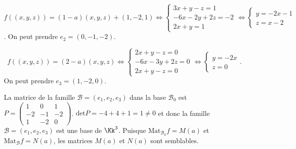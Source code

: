 {{\textbullet~$f((x,y,z)) =(1-a)(x,y,z)+(1,-2,1)\Leftrightarrow\left\{
\begin{array}{l}
3x+y-z=1\\
-6x-2y+2z=-2\\
2x+y=1
\end{array}
\right.\Leftrightarrow\left\{
\begin{array}{l}
y=-2x-1\\
z=x-2
\end{array}
\right.$. On peut prendre $e_2=(0,-1,-2)$.

\textbullet~$f((x,y,z)) =(2-a)(x,y,z)\Leftrightarrow\left\{
\begin{array}{l}
2x+y-z=0\\
-6x-3y+2z=0\\
2x+y-z=0
\end{array}
\right.\Leftrightarrow\left\{
\begin{array}{l}
y=-2x\\
z=0
\end{array}
\right.$. On peut prendre $e_3=(1,-2,0)$.

La matrice de la famille $\mathcal{B}=(e_1,e_2,e_3)$ dans la base $\mathcal{B}_0$ est $P=\left(
\begin{array}{ccc}
1&0&1\\
-2&-1&-2\\
1&-2&0
\end{array}
\right)$. $\text{det}P=-4+4+1 =1\neq 0$ et donc la famille $\mathcal{B}=(e_1,e_2,e_3)$ est une base de $\Kk^3$. Puisque $\text{Mat}_{\mathcal{B}_0}f=
M(a)$ et $\text{Mat}_{\mathcal{B}}f=N(a)$, les matrices $M(a)$ et $N(a)$ sont semblables.
}
}
